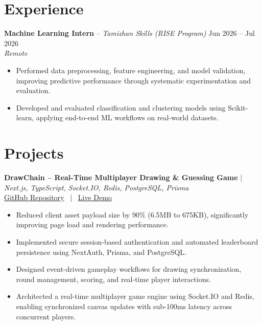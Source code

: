 \documentclass[10pt, a4paper]{article}
\begin{document}

\section{Experience}

\textbf{Machine Learning Intern} -- \textit{Tamizhan Skills (RISE Program)} \hfill Jun 2026 -- Jul 2026 \\
\textit{\small{Remote}} \\
\begin{itemize}

    \item Performed data preprocessing, feature engineering, and model validation, improving predictive performance through systematic experimentation and evaluation.

    \item Developed and evaluated classification and clustering models using Scikit-learn, applying end-to-end ML workflows on real-world datasets.

\end{itemize}
\vspace{2pt}



\section{Projects}

\textbf{DrawChain -- Real-Time Multiplayer Drawing \& Guessing Game} $|$ \textit{Next.js, TypeScript, Socket.IO, Redis, PostgreSQL, Prisma} \\

\small{
\href{https://github.com/PankajKumar-11/DrawChain}{GitHub Repository}
 \ $|$ \ \href{https://demo.example.com}{Live Demo}
} \\

\begin{itemize}

    \item Reduced client asset payload size by 90\% (6.5MB to 675KB), significantly improving page load and rendering performance.

    \item Implemented secure session-based authentication and automated leaderboard persistence using NextAuth, Prisma, and PostgreSQL.

    \item Designed event-driven gameplay workflows for drawing synchronization, round management, scoring, and real-time player interactions.

    \item Architected a real-time multiplayer game engine using Socket.IO and Redis, enabling synchronized canvas updates with sub-100ms latency across concurrent players.

\end{itemize}
\vspace{2pt}
\end{document}
